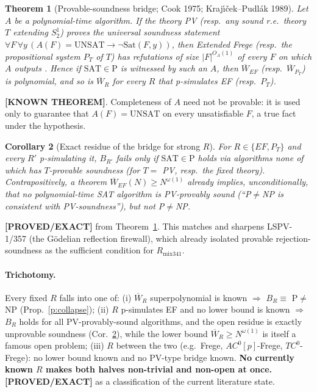 \documentclass[11pt]{article}
\newtheorem{theorem}{Theorem}
\newtheorem{corollary}[theorem]{Corollary}
\theoremstyle{remark}
\newcommand{\SAT}{\mathrm{SAT}}
\newcommand{\UNSAT}{\mathrm{UNSAT}}
\newcommand{\Wb}{\overline W}
\newcommand{\status}[1]{\textbf{[#1]}}
\begin{document}
\begin{theorem}[Provable-soundness bridge; Cook 1975; Kraj\'\i\v{c}ek--Pudl\'ak 1989]\label{t:pv}
Let $A$ be a polynomial-time algorithm. If the theory PV (resp.\ any sound r.e.\ theory $T$
extending $S^1_2$) proves the universal soundness statement
$\forall F\,\forall y\,(A(F)=\UNSAT\to\neg\mathrm{Sat}(F,y))$, then Extended Frege (resp.\ the
propositional system $P_T$ of $T$) has refutations of size $|F|^{O_A(1)}$ of every $F$ on which
$A$ outputs \UNSAT. Hence if $\SAT\in\mathrm P$ is witnessed by such an $A$, then
$\Wb_{EF}$ (resp.\ $\Wb_{P_T}$) is polynomial, and so is $\Wb_R$ for every $R$ that
p-simulates EF (resp.\ $P_T$).
\end{theorem}
\status{KNOWN THEOREM}. Completeness of $A$ need not be provable: it is used only to guarantee
that $A(F)=\UNSAT$ on every unsatisfiable $F$, a true fact under the hypothesis.

\begin{corollary}[Exact residue of the bridge for strong $R$]\label{c:residue}
For $R\in\{EF, P_T\}$ and every $R'$ p-simulating it, $B_{R'}$ fails only if $\SAT\in\mathrm P$
holds via algorithms \emph{none} of which has $T$-provable soundness (for $T=$ PV, resp.\ the
fixed theory). Contrapositively, a theorem $\Wb_{EF}(N)\ge N^{\omega(1)}$ already implies,
unconditionally, that no polynomial-time SAT algorithm is PV-provably sound
(``P$\neq$NP is consistent with PV-soundness''), but not P$\neq$NP.
\end{corollary}
\status{PROVED/EXACT} from Theorem~\ref{t:pv}. This matches and sharpens LSPV-1/357 (the
G\"odelian reflection firewall), which already isolated provable rejection-soundness as the
sufficient condition for $R_{\mathrm{mix341}}$.

\paragraph{Trichotomy.} Every fixed $R$ falls into one of:
(i) $\Wb_R$ superpolynomial is known $\Rightarrow$ $B_R\equiv$ P$\neq$NP (Prop.~\ref{p:collapse});
(ii) $R$ p-simulates EF and no lower bound is known $\Rightarrow$ $B_R$ holds for all
PV-provably-sound algorithms, and the open residue is exactly unprovable soundness
(Cor.~\ref{c:residue}), while the lower bound $\Wb_R\ge N^{\omega(1)}$ is itself a famous open
problem; (iii) $R$ between the two (e.g.\ Frege, $AC^0[p]$-Frege, $TC^0$-Frege): no lower bound
known and no PV-type bridge known. \textbf{No currently known $R$ makes both halves non-trivial
and non-open at once.} \status{PROVED/EXACT} as a classification of the current literature state.
\end{document}
